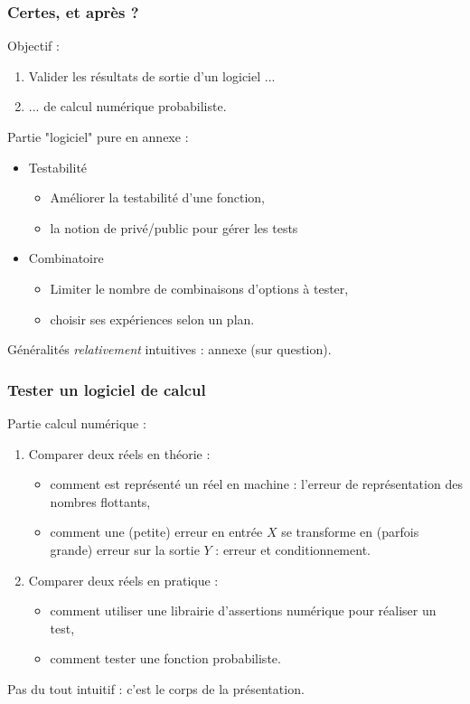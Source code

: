 \documentclass{beamer}
\begin{document}
\begin{frame}[containsverbatim]
\frametitle{Certes, et après ?}

Objectif :
\begin{enumerate}
\item Valider les résultats de sortie d'un logiciel ...
\item ... de calcul numérique probabiliste.
\end{enumerate}

Partie "logiciel" pure en annexe :
\begin{itemize}
\item Testabilité 
	\begin{itemize}
	\item Améliorer la testabilité d'une fonction, 
	\item la notion de privé/public pour gérer les tests
	\end{itemize}
\item Combinatoire 
	\begin{itemize}
	\item Limiter le nombre de combinaisons d'options à tester, 
	\item choisir ses expériences selon un plan.
	\end{itemize}
\end{itemize}

Généralités \emph{relativement} intuitives : annexe (sur question).

\end{frame}


\begin{frame}[containsverbatim]
\frametitle{Tester un logiciel de calcul}

Partie calcul numérique :
\begin{enumerate}
\item Comparer deux réels en théorie :
	\begin{itemize}
	\item comment est représenté un réel en machine : 
	l'erreur de représentation des nombres flottants,
	\item comment une (petite) erreur en entrée $X$ se transforme en 
	(parfois grande) erreur sur la sortie $Y$ : erreur et conditionnement.
	\end{itemize}
\item Comparer deux réels en pratique :
	\begin{itemize}
	\item comment utiliser une librairie d'assertions numérique 
	pour réaliser un test,
	\item comment tester une fonction probabiliste.
	\end{itemize}
\end{enumerate}

Pas du tout intuitif : c'est le corps de la présentation.

\end{frame}
\end{document}
